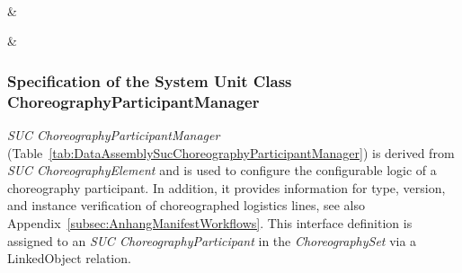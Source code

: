 \begin{footnotesize}
\begin{longtable}
		  \\ \hline
		
		\\ \hline
	
		\\ \hline
	
		     & 
		\\ \hline
	
		     & 
		\\ \hline
	
	\end{longtable}
\end{footnotesize}

\subsubsection{Specification of the System Unit Class ChoreographyParticipantManager}

\emph{SUC ChoreographyParticipantManager} (Table~\ref{tab:DataAssemblySucChoreographyParticipantManager}) is derived from \emph{SUC ChoreographyElement} and is used to configure the configurable logic of a choreography participant. In addition, it provides information for type, version, and instance verification of choreographed logistics lines, see also Appendix~\ref{subsec:AnhangManifestWorkflows}. This interface definition is assigned to an \emph{SUC ChoreographyParticipant} in the \emph{ChoreographySet} via a LinkedObject relation.

